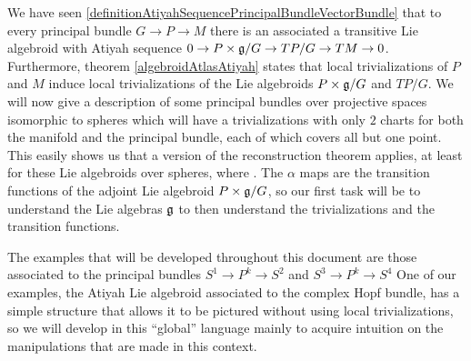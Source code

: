  We have seen \ref{definitionAtiyahSequencePrincipalBundleVectorBundle} that to every principal bundle $G \to P \to M$ there is an associated a transitive Lie algebroid with Atiyah sequence $0 \to P \times \mathfrak{g} / G \to TP/G \to TM \to 0$. Furthermore, theorem \ref{algebroidAtlasAtiyah} states that local trivializations of $P$ and $M$ induce local trivializations of the Lie algebroids $P \times \mathfrak{g}/G$ and $TP/G$. We will now give a description of some principal bundles over projective spaces isomorphic to spheres which will have a trivializations with only $2$ charts for both the manifold and the principal bundle, each of which covers all but one point. This easily shows us that a version of the reconstruction theorem applies, at least for these Lie algebroids over spheres, where .
 The $\alpha$ maps are the transition functions of the adjoint Lie algebroid $P \times \mathfrak{g}/G$, so our first task will be to understand the Lie algebras $\mathfrak{g}$ to then understand the trivializations and the transition functions.
    
    
    
    
    
    
    
The examples that will be developed throughout this document are those associated to the principal bundles $S^1 \to P^k \to S^2$ and $S^3 \to P^k \to S^4$ One of our examples, the Atiyah Lie algebroid associated to the complex Hopf bundle, has a simple structure that allows it to be pictured without using local trivializations, so we will develop in this ``global'' language mainly to acquire intuition on the manipulations that are made in this context. %

